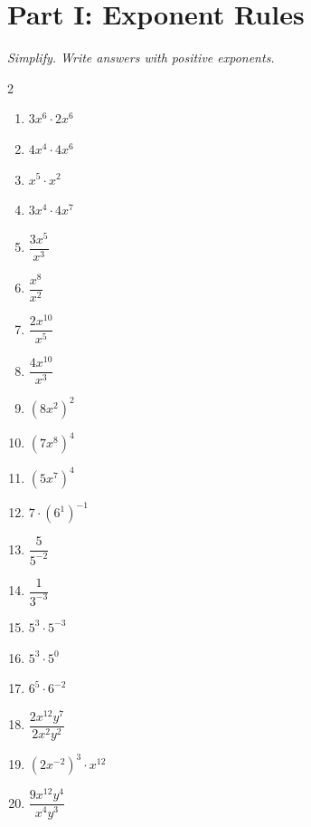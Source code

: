 \documentclass[11pt]{article}
\begin{document}
\section*{Part I: Exponent Rules}
\noindent\textit{Simplify. Write answers with positive exponents.}
\begin{multicols}{2}
\begin{enumerate}
  \item $3x^{6} \cdot 2x^{6}$
  \vspace{1.3cm}
  \item $4x^{4} \cdot 4x^{6}$
  \vspace{1.3cm}
  \item $x^{5} \cdot x^{2}$
  \vspace{1.3cm}
  \item $3x^{4} \cdot 4x^{7}$
  \vspace{1.3cm}
  \item $\dfrac{3x^{5}}{x^{3}}$
  \vspace{1.3cm}
  \item $\dfrac{x^{8}}{x^{2}}$
  \vspace{1.3cm}
  \item $\dfrac{2x^{10}}{x^{5}}$
  \vspace{1.3cm}
  \item $\dfrac{4x^{10}}{x^{3}}$
  \vspace{1.3cm}
  \item $(8x^{2})^{2}$
  \vspace{1.3cm}
  \item $(7x^{8})^{4}$
  \vspace{1.3cm}
  \item $(5x^{7})^{4}$
  \vspace{1.3cm}
  \item $7 \cdot (6^{1})^{-1}$
  \vspace{1.3cm}
  \item $\dfrac{5}{5^{-2}}$
  \vspace{1.3cm}
  \item $\dfrac{1}{3^{-3}}$
  \vspace{1.3cm}
  \item $5^{3} \cdot 5^{-3}$
  \vspace{1.3cm}
  \item $5^{3} \cdot 5^{0}$
  \vspace{1.3cm}
  \item $6^{5} \cdot 6^{-2}$
  \vspace{1.3cm}
  \item $\dfrac{2x^{12}y^{7}}{2x^{2}y^{2}}$
  \vspace{1.3cm}
  \item $(2x^{-2})^{3} \cdot x^{12}$
  \vspace{1.3cm}
  \item $\dfrac{9x^{12}y^{4}}{x^{4}y^{3}}$
  \vspace{1.3cm}
\end{enumerate}
\end{multicols}
\end{document}
